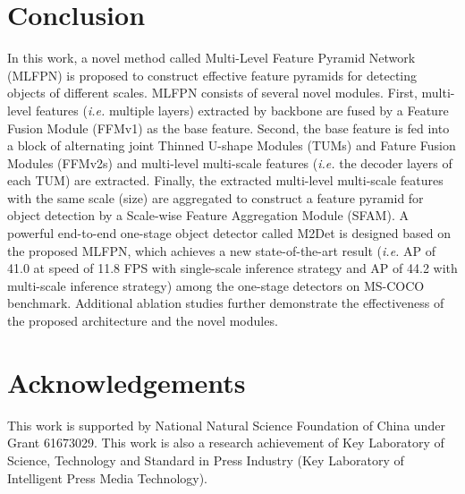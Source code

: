 \documentclass[letterpaper]{article} \usepackage{aaai18}  \usepackage{times}  \usepackage{helvet}  \usepackage{courier}  \usepackage{url}  \usepackage{graphicx}
\begin{document}
\section{Conclusion}
In this work, a novel method called Multi-Level Feature Pyramid Network (MLFPN) is proposed to construct effective feature pyramids for detecting objects of different scales. MLFPN consists of several novel modules. First, multi-level features (\textit{i.e.} multiple layers) extracted by backbone are fused by a Feature Fusion Module (FFMv1) as the base feature. Second, the base feature is fed into a block of alternating joint Thinned U-shape Modules (TUMs) and Fature Fusion Modules (FFMv2s) and multi-level multi-scale features (\textit{i.e.} the decoder layers of each TUM) are extracted. Finally, the extracted multi-level multi-scale features with the same scale (size) are aggregated to construct a feature pyramid for object detection by a Scale-wise Feature Aggregation Module (SFAM). A powerful end-to-end one-stage object detector called M2Det is designed based on the proposed MLFPN, which achieves a new state-of-the-art result (\textit{i.e.} AP of 41.0 at speed of 11.8 FPS with single-scale inference strategy and AP of 44.2 with multi-scale inference strategy) among the one-stage detectors on MS-COCO benchmark. Additional ablation studies further demonstrate the effectiveness of the proposed architecture and the novel modules.

\section{Acknowledgements}
This work is supported by National Natural Science Foundation of China under Grant
61673029. This work is also a research achievement of Key Laboratory of Science, Technology and Standard
in Press Industry (Key Laboratory of Intelligent Press Media Technology).



\end{document}
